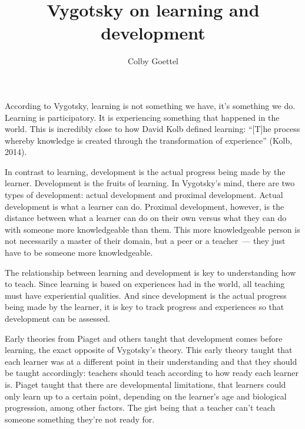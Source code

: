 \documentclass[12pt]{article}
\title{Vygotsky on learning and development}
\author{Colby Goettel}
\begin{document}
\maketitle


According to Vygotsky, learning is not something we have, it's something we do. Learning is participatory. It is experiencing something that happened in the world. This is incredibly close to how David Kolb defined learning: ``[T]he process whereby knowledge is created through the transformation of experience'' (Kolb, 2014).

In contrast to learning, development is the actual progress being made by the learner. Development is the fruits of learning. In Vygotsky's mind, there are two types of development: actual development and proximal development. Actual development is what a learner can do. Proximal development, however, is the distance between what a learner can do on their own versus what they can do with someone more knowledgeable than them. This more knowledgeable person is not necessarily a master of their domain, but a peer or a teacher~--- they just have to be someone more knowledgeable.

The relationship between learning and development is key to understanding how to teach. Since learning is based on experiences had in the world, all teaching must have experiential qualities. And since development is the actual progress being made by the learner, it is key to track progress and experiences so that development can be assessed.

Early theories from Piaget and others taught that development comes before learning, the exact opposite of Vygotsky's theory. This early theory taught that each learner was at a different point in their understanding and that they should be taught accordingly: teachers should teach according to how ready each learner is. Piaget taught that there are developmental limitations, that learners could only learn up to a certain point, depending on the learner's age and biological progression, among other factors. The gist being that a teacher can't teach someone something they're not ready for.
\end{document}

